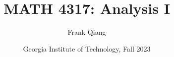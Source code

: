 \documentclass[12pt, letterpaper, oneside]{book}
\title{MATH 4317: Analysis I}
\author{Frank Qiang}
\date{Georgia Institute of Technology, Fall 2023}
\theoremstyle{definition}
\begin{document}
  \maketitle

  \begingroup
  \let\cleardoublepage\clearpage
  \tableofcontents
  \endgroup

  
  
  
  
  
  
  
  
  
  
  
  
  
  
  
  
  
  
\end{document}
